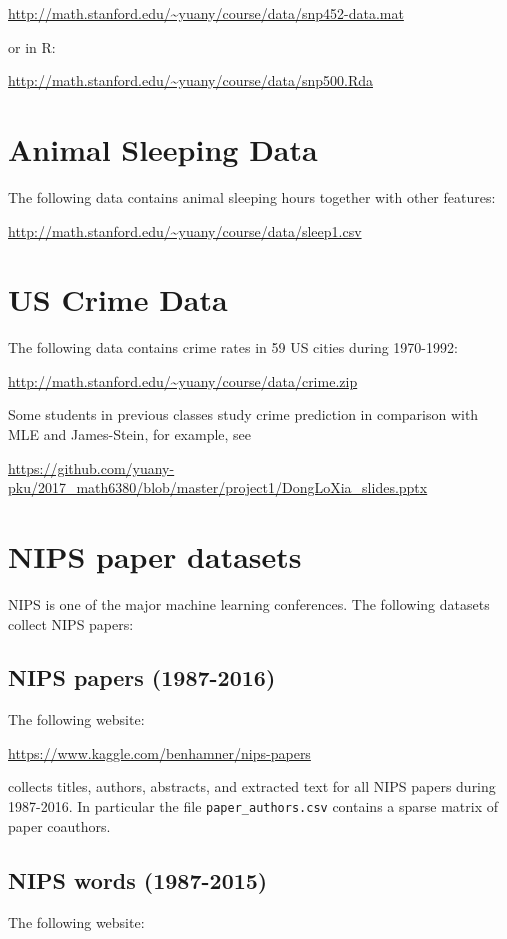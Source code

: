 \documentclass[11pt]{article}
\begin{document}
\url{http://math.stanford.edu/~yuany/course/data/snp452-data.mat} 

\noindent or in R: 

\url{http://math.stanford.edu/~yuany/course/data/snp500.Rda}


\section{Animal Sleeping Data} The following data contains animal sleeping hours together with other features: 

\url{http://math.stanford.edu/~yuany/course/data/sleep1.csv}


\section{US Crime Data} The following data contains crime rates in 59 US cities during 1970-1992:

\url{http://math.stanford.edu/~yuany/course/data/crime.zip}

\noindent Some students in previous classes study crime prediction in comparison with MLE and James-Stein, for example, see

\url{https://github.com/yuany-pku/2017_math6380/blob/master/project1/DongLoXia_slides.pptx}


\section{NIPS paper datasets}
NIPS is one of the major machine learning conferences. The following datasets collect NIPS papers:

\subsection{NIPS papers (1987-2016)} The following website: 

\url{https://www.kaggle.com/benhamner/nips-papers}

\noindent collects titles, authors, abstracts, and extracted text for all NIPS papers during 1987-2016. In particular the file {\texttt{paper\_authors.csv}} contains a sparse matrix of paper coauthors. 

\subsection{NIPS words (1987-2015)} The following website:
\end{document}
